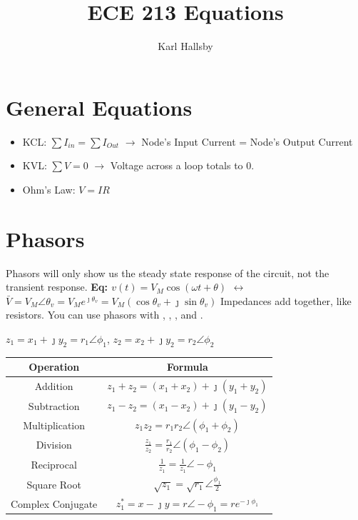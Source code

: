 \documentclass[10pt,letterpaper,final,twoside,notitlepage]{article}
\author{Karl Hallsby}
\title{ECE 213 Equations}
\begin{document}
\section*{General Equations}
	\begin{itemize}[noitemsep] %
		\item KCL: $\sum I_{in} = \sum I_{Out}$ $\rightarrow$ Node's Input Current = Node's Output Current
		\item KVL: $\sum V = 0$ $\rightarrow$ Voltage across a loop totals to 0.
		\item Ohm's Law: $V=IR$
	\end{itemize}

\section*{Phasors} \label{sec:Phasors}
Phasors will only show us the steady state response of the circuit, not the transient response. \newline \newline
\textbf{\large Eq: $v(t)=V_{M} \cos \left(\omega t + \theta \right)$ $\leftrightarrow$ $\bar{V}=V_{M} \angle \theta_{v} = V_{M}e^{\jmath \theta_{v}} = V_{M}\left(\cos \theta_{v} + \jmath \sin \theta_{v}\right)$} \newline
Impedances add together, like resistors.
You can use phasors with , , , and . \newline
	\begin{table}[ht] %
		\centering
		\renewcommand{\arraystretch}{1.4}
		$z_1=x_1+\jmath y_2=r_1\angle\phi_1$, $z_2=x_2+\jmath y_2=r_2\angle\phi_2$
		\begin{tabular}{|c|c|} 
			\hline
			Operation & Formula \\ \hline
			Addition & $z_1+z_2=\left( x_1+x_2 \right)+ \jmath \left( y_1+y_2 \right)$ \\ \hline
			Subtraction & $z_1-z_2=\left( x_1-x_2 \right)+ \jmath \left( y_1-y_2 \right)$ \\ \hline
			Multiplication & $z_{1}z_{2}=r_{1}r_{2}\angle \left( \phi_1 + \phi_2 \right)$ \\ \hline
			Division & $\frac{z_{1}}{z_{2}} = \frac{r_{1}}{r_{2}} \angle \left(\phi_1 - \phi_2 \right)$ \\ \hline
			Reciprocal & $\frac{1}{z_1}=\frac{1}{z_1} \angle -\phi_1$ \\ \hline
			Square Root & $\sqrt{z_1}=\sqrt{r_1} \angle \frac{\phi_1}{2}$ \\ \hline
			Complex Conjugate & $ z_1^*=x- \jmath y=r \angle -\phi_1=re^{-\jmath \phi_1}$\\ \hline
		\end{tabular}
	\end{table}
\end{document}
